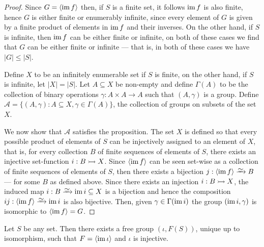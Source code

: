 \begin{proof} Since \(G = \left\langle \operatorname{im} f \right\rangle\) then, if \(S\) is a
    finite set, it follows \(\operatorname{im} f\) is also finite, hence \(G\) is either finite or
    enumerably infinite, since every element of \(G\) is given by a finite product
    of elements in \(\operatorname{im} f\) and their inverses. On the other hand, if \(S\) is
    infinite, then \(\operatorname{im} f\) can be either finite or infinite, on both of these
    cases we find that \(G\) can be either finite or infinite --- that is, in both
    of these cases we have \(|G| \leq |S|\).

    Define \(X\) to be an infinitely enumerable set if \(S\) is finite, on the other
    hand, if \(S\) is infinite, let \(|X| = |S|\). Let \(A \subseteq X\) be
    non-empty and define \(\Gamma(A)\) to be the collection of binary operations
    \(\gamma: A \times A \to A\) such that \((A, \gamma)\) is a group. Define
    \(\mathcal{A} = \{(A, \gamma) \colon A \subseteq X, \gamma \in \Gamma(A)\}\), the
    collection of groups on subsets of the set \(X\).

    We now show that \(\mathcal{A}\) satisfies the proposition. The set \(X\) is
    defined so that every possible product of elements of \(S\) can be injectively
    assigned to an element of \(X\), that is, for every collection \(B\) of finite
    sequences of elements of \(S\), there exists an injective set-function \(i: B
    \rightarrowtail X\). Since \(\left\langle \operatorname{im} f \right\rangle\) can be seen set-wise as a
    collection of finite sequences of elements of \(S\), then there exists a
    bijection \(j: \left\langle \im f \right\rangle \isoto B\) --- for some \(B\) as
    defined above. Since there exists an injection \(i: B \rightarrowtail X\), the induced map
    \(i: B \isoto \im i \subseteq X\) is a bijection and hence the composition \(ij:
    \left\langle \im f \right\rangle \isoto \im i\) is also bijective. Then, given
    \(\gamma \in \Gamma(\operatorname{im} i)\) the group \((\operatorname{im} i, \gamma)\) is isomorphic to
    \(\left\langle \operatorname{im} f \right\rangle = G\).
\end{proof}

\begin{proposition}
    \label{prop:universal-free-group}
    Let \(S\) be any set. Then there exists a free group \((\iota, F(S))\), unique
    up to isomorphism, such that \(F = \left\langle \operatorname{im} \iota \right\rangle\) and
    \(\iota\) is injective.
\end{proposition}

